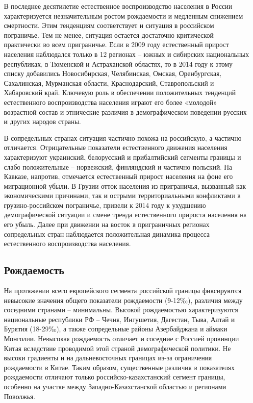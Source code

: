 \documentclass[]{book}
\begin{document}
В последнее десятилетие естественное воспроизводство населения в России
характеризуется незначительным ростом рождаемости и медленным снижением
смертности. Этим тенденциям соответствует и ситуация в российском
пограничье. Тем не менее, ситуация остается достаточно критической
практически во всем приграничье. Если в 2009 году естественный прирост
населения наблюдался только в 12 регионах -- южных и сибирских
национальных республиках, в Тюменской и Астраханской областях, то в 2014
году к этому списку добавились Новосибирская, Челябинская, Омская,
Оренбургская, Сахалинская, Мурманская области, Краснодарский,
Ставропольский и Хабаровский край. Ключевую роль в обеспечении
положительных тенденций естественного воспроизводства населения играют
его более «молодой» возрастной состав и этнические различия в
демографическом поведении русских и других народов страны.

В сопредельных странах ситуация частично похожа на российскую, а
частично -- отличается. Отрицательные показатели естественного движения
населения характеризуют украинский, белорусский и прибалтийский сегменты
границы и слабо положительные -- норвежский, финляндский и частично
польский. На Кавказе, напротив, отмечается естественный прирост
населения на фоне его миграционной убыли. В Грузии отток населения из
приграничья, вызванный как экономическими причинами, так и острыми
территориальными конфликтами в грузино-российском пограничье, привели к
2014 году к ухудшению демографической ситуации и смене тренда
естественного прироста населения на его убыль. Далее при движении на
восток в приграничных регионах сопредельных стран наблюдается
положительная динамика процесса естественного воспроизводства населения.

\subsection{Рождаемость}\label{demo-situ-bir}

На протяжении всего европейского сегмента российской границы фиксируются
невысокие значения общего показатели рождаемости (9-12‰), различия между
соседними странами -- минимальны. Высокой рождаемостью характеризуются
национальные республики РФ -- Чечня, Ингушетия, Дагестан, Тыва, Алтай и
Бурятия (18-29‰), а также сопредельные районы Азербайджана и аймаки
Монголии. Невысокая рождаемость отличает и соседние с Россией провинции
Китая вследствие проводимой этой страной демографической политики. Не
высоки градиенты и на дальневосточных границах из-за ограничения
рождаемости в Китае. Таким образом, существенные различия в показателях
рождаемости отличают только российско-казахстанский сегмент границы,
особенно на участке между Западно-Казахстанской областью и регионами
Поволжья.
\end{document}
